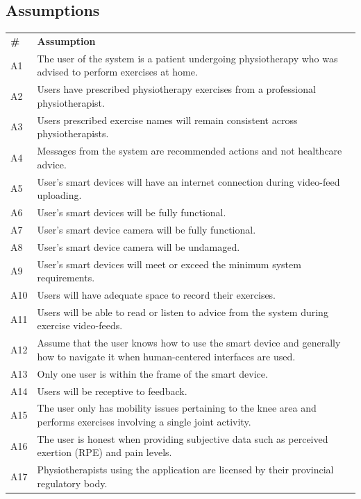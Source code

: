 \documentclass[12pt]{article}
\begin{document}
\subsection{Assumptions}
\begin{table}[H]
\begin{tabular}{l m{10cm}}
  \textbf{\#} & \textbf{Assumption} \\
  A1 & The user of the system is a patient undergoing physiotherapy who was advised to perform exercises at home. \\
  A2 & Users have prescribed physiotherapy exercises from a professional physiotherapist. \\
  A3 & Users prescribed exercise names will remain consistent across physiotherapists. \\
  A4 & Messages from the system are recommended actions and not healthcare advice. \\
  A5 & User’s smart devices will have an internet connection during video-feed uploading. \\
  A6 & User’s smart devices will be fully functional. \\
  A7 & User’s smart device camera will be fully functional. \\
  A8 & User’s smart device camera will be undamaged. \\
  A9 & User’s smart devices will meet or exceed the minimum system requirements. \\
  A10 & Users will have adequate space to record their exercises. \\
  A11 & Users will be able to read or listen to advice from the system during exercise video-feeds. \\
  A12 & Assume that the user knows how to use the smart device and generally how to navigate it when human-centered interfaces are used. \\
  A13 & Only one user is within the frame of the smart device. \\
  A14 & Users will be receptive to feedback. \\
  A15 & The user only has mobility issues pertaining to the knee area and performs exercises involving a single joint activity. \\
  A16 & The user is honest when providing subjective data such as perceived exertion (RPE) and pain levels. \\
  A17 & Physiotherapists using the application are licensed by their provincial regulatory body.
  \end{tabular}
\end{table}
\end{document}
